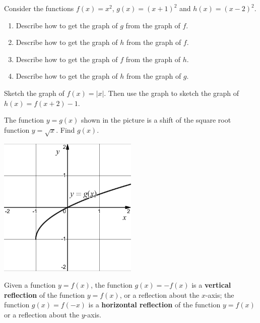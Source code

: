 \begin{example}
  Consider the functions $f(x)=x^2$, $g(x)=(x+1)^2$ and $h(x)=(x-2)^2$.
  \begin{enumerate}
    \item Describe how to get the graph of $g$ from the graph of $f$.
    \vspace*{3\baselineskip}
    \item Describe how to get the graph of $h$ from the graph of $f$.
    \vspace*{3\baselineskip}
    \item Describe how to get the graph of $f$ from the graph of $h$.
    \vspace*{3\baselineskip}
    \item Describe how to get the graph of $h$ from the graph of $g$.
    \vspace*{3\baselineskip}
  \end{enumerate}
\end{example}

\newpage

\begin{example}
  Sketch the graph of \(f(x)=|x|\). Then use the graph to sketch the graph of \(h(x)=f(x+2)-1\). 
\end{example}

\begin{example}
  The function $y=g(x)$ shown in the picture is a shift of the square root function $y=\sqrt{x}$. Find $g(x)$.
  \begin{center}
    \raggedright\includegraphics[width=0.5\textwidth]{figs/shiftsqrtexm.png}
  \end{center}
\end{example}
\vspace*{-0.4\textheight}

\newpage

\begin{definition}
  Given a function \(y=f(x)\), the function \(g(x)=-f(x)\) is a \textbf{vertical reflection} of the function \(y=f(x)\), or a reflection about the $x$-axis;
the function \(g(x)=f(-x)\) is a \textbf{horizontal reflection} of the function \(y=f(x)\) or a reflection about the $y$-axis.
\end{definition}

